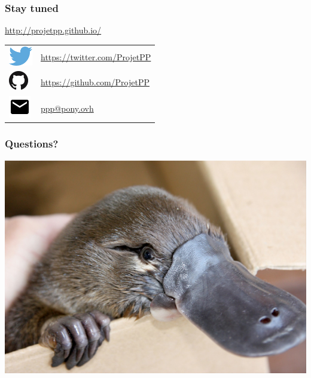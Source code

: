\newlength{\logosize}
\setlength{\logosize}{12pt}
\begin{frame}[fragile]
    \frametitle{Stay tuned}
    \alert{\url{http://projetpp.github.io/}}

    \begin{tabular}{ll}
        \includegraphics[width=\logosize]{Twitter_logo_blue.png} & \href{https://twitter.com/ProjetPP}{https://twitter.com/ProjetPP}\\
        \includegraphics[width=\logosize]{GitHub-Mark-32px.png} &  \href{https://github.com/ProjetPP}{https://github.com/ProjetPP}\\
        \includegraphics[width=\logosize]{ic_email_black_18dp.png} & \href{mailto:ppp@pony.ovh}{ppp@pony.ovh}\\
    \end{tabular}
\end{frame}


\begin{frame}
    \frametitle{Questions?}
    \includegraphics[width=\linewidth]{figures/platypusLg.jpg}
\end{frame}
